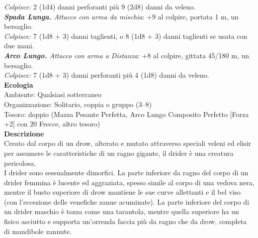 \begin{multicols}{2}
\emph{Colpisce:} 2 (1d4) danni perforanti più 9 (2d8) danni da veleno.\\
\emph{\textbf{Spada Lunga.} Attacco con arma da mischia}: +9 al colpire, portata 1 m, un bersaglio.\\
\emph{Colpisce:} 7 (1d8 + 3) danni taglienti, o 8 (1d8 + 3) danni taglienti se usata con due mani.\\
\emph{\textbf{Arco Lungo.} Attacco con arma a Distanza}: +8 al colpire, gittata 45/180 m, un bersaglio.\\
\emph{Colpisce:} 7 (1d8 + 3) danni perforanti più 4 (1d8) danni da veleno.\\
\textbf{Ecologia}\\
Ambiente: Qualsiasi sotterraneo\\
Organizzazione: Solitario, coppia o gruppo (3–8)\\
Tesoro: doppio (Mazza Pesante Perfetta, Arco Lungo Composito Perfetto [Forza +2] con 20 Frecce, altro tesoro)\\
\textbf{Descrizione}\\
Creato dal corpo di un drow, alterato e mutato attraverso speciali veleni ed elisir per assumere le caratteristiche di un ragno gigante, il drider è una creatura pericolosa.\\
I drider sono sessualmente dimorfici. La parte inferiore da ragno del corpo di un drider femmina è lucente ed aggraziata, spesso simile al corpo di una vedova nera, mentre il busto superiore di drow mantiene le sue curve allettanti e il bel viso (con l'eccezione delle venefiche zanne acuminate). La parte inferiore del corpo di un drider maschio è tozza come una tarantola, mentre quella superiore ha un fisico asciutto e supporta un’orrenda faccia più da ragno che da drow, completa di mandibole zannute.\\


\end{multicols}
